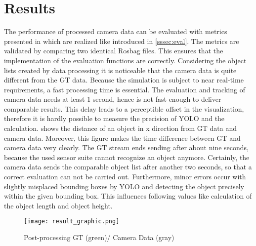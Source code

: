 \section{Results}\label{Results}
	
	The performance of processed camera data can be evaluated with metrics presented in \cite{Reway} which are realized like introduced in \cref{sssec:eval}. The metrics are validated by comparing two identical Rosbag files. This ensures that the implementation of the evaluation functions are correctly.
	Considering the object lists created by data processing it is noticeable that the camera data is quite different from the \ac{GT} data. Because the simulation is subject to near real-time requirements, a fast processing time is essential. The evaluation and tracking of camera data needs at least 1 second, hence is not fast enough to deliver comparable results. This delay leads to a perceptible offset in the visualization, therefore it is hardly possible to measure the precision of \ac{YOLO} and the calculation.
	 shows the distance of an object in x direction from \ac{GT} data and camera data. Moreover, this figure  makes the time difference between \ac{GT} and camera data very clearly. The \ac{GT} stream ends sending after about nine seconds, because the used sensor suite cannot recognize an object anymore. Certainly, the camera data  sends the comparable object list after another two seconds, so that a correct evaluation can not be carried out. Furthermore, minor errors occur with slightly misplaced bounding boxes by \ac{YOLO} and detecting the object precisely within the given bounding box. This influences following values like calculation of the object length and object height.\\
	
	\begin{figure}[H]
		\centering
		\texttt{[image: result\_graphic.png]}
		\caption{Post-processing GT (green)/ Camera Data (gray)}
		\label{fig:result}
	\end{figure}
%	
